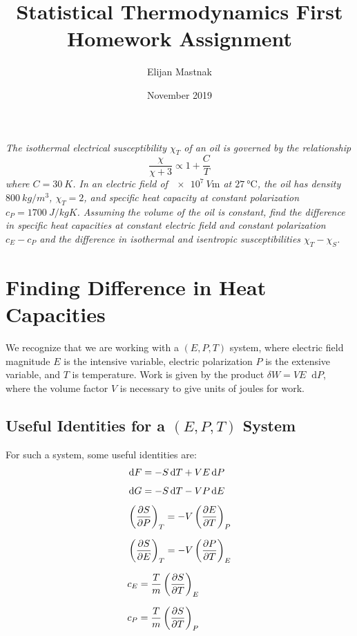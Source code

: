 \documentclass[11pt, a4paper]{article}
\newcommand*\diff{\mathop{}\!\mathrm{d}} %
\begin{document}
	\title{Statistical Thermodynamics First Homework Assignment}
	\author{Elijan Mastnak}
	\date{November 2019}
	\maketitle
	
\textit{The isothermal electrical susceptibility $ \chi_T $ of an oil is governed by the relationship}
\begin{equation*}
	\frac{\chi}{\chi + 3} \propto 1 + \frac{C}{T}
\end{equation*}
\textit{where $ C = \SI{30}{K} $. In an electric field of $ \SI{e7}{V\m} $ at $ \SI{27}{\degreeCelsius} $, the oil has density $ \SI{800}{kg/m^3} $, $ \chi_T = 2 $, and specific heat capacity at constant polarization $ c_P = \SI{1700}{J/kg K} $. Assuming the volume of the oil is constant, find the difference in specific heat capacities at constant electric field and constant polarization $ c_E - c_P $ and the difference in isothermal and isentropic susceptibilities $ \chi_T - \chi_S $.}

\section*{Finding Difference in Heat Capacities}
We recognize that we are working with a $ (E, P, T) $ system, where electric field magnitude $ E $ is the intensive variable, electric polarization $ P $ is the extensive variable, and $ T $ is temperature. Work is given by the product $ \delta W = V E \diff P $, where the volume factor $ V $ is necessary to give units of joules for work. 

\subsection*{Useful Identities for a $ (E, P, T) $ System}
For such a system, some useful identities are:
\begin{align}
	& \diff F = - S \diff T + V E \diff P \nonumber \\[1.0ex]
	& \diff G = - S \diff T - V P \diff E \nonumber \\[1.0ex]
	& \left(\pdv{S}{P}\right)_T = -V \left(\pdv{E}{T}\right)_P \label{eq:maxwell1}\\[1.5ex]
	& \left(\pdv{S}{E}\right)_T = -V \left(\pdv{P}{T}\right)_E \label{eq:maxwell2} \\[1.5ex]
	& c_E = \frac{T}{m} \left(\pdv{S}{T}\right)_E \label{eq:c_E_def}\\[1.5ex]
	& c_P = \frac{T}{m} \left(\pdv{S}{T}\right)_P \label{eq:c_P_def}
\end{align}
\end{document}
